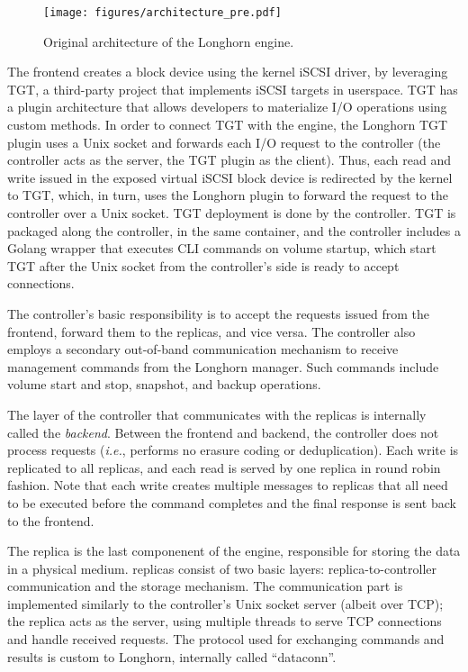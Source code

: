 \begin{figure}[htb]
    \centering
    \texttt{[image: figures/architecture\_pre.pdf]}
    \caption{Original architecture of the Longhorn engine.}
    \label{fig:old-sys}
\end{figure}

The frontend creates a block device using the kernel iSCSI driver, by leveraging TGT, a third-party project that implements iSCSI targets in userspace. TGT has a plugin architecture that allows developers to materialize I/O operations using custom methods.
In order to connect TGT with the engine, the Longhorn TGT plugin uses a Unix socket and forwards each I/O request to the controller (the controller acts as the server, the TGT plugin as the client). Thus, each read and write issued in the exposed virtual iSCSI block device is redirected by the kernel to TGT, which, in turn, uses the Longhorn plugin to forward the request to the controller over a Unix socket.
TGT deployment is done by the controller. TGT is packaged along the controller, in the same container, and the controller includes a Golang wrapper that executes CLI commands on volume startup, which start TGT after the Unix socket from the controller's side is ready to accept connections.

The controller's basic responsibility is to accept the requests issued from the frontend, forward them to the replicas, and vice versa. The controller also employs a secondary out-of-band communication mechanism to receive management commands from the Longhorn manager. Such commands include volume start and stop, snapshot, and backup operations.

The layer of the controller that communicates with the replicas is internally called the \textit{backend}. Between the frontend and backend, the controller does not process requests (\textit{i.e.}, performs no erasure coding or deduplication). Each write is replicated to all replicas, and each read is served by one replica in round robin fashion. Note that each write creates multiple messages to replicas that all need to be executed before the command completes and the final response is sent back to the frontend.

The replica is the last componenent of the engine, responsible for storing the data in a physical medium. replicas consist of two basic layers: replica-to-controller communication and the storage mechanism. The communication part is implemented similarly to the controller's Unix socket server (albeit over TCP); the replica acts as the server, using multiple threads to serve TCP connections and handle received requests. The protocol used for exchanging commands and results is custom to Longhorn, internally called ``dataconn''.

